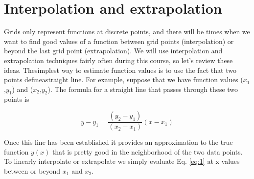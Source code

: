  		\section*{Interpolation and extrapolation}
     
    Grids only represent functions at discrete points, and there will be times when we want to find good values of a function between grid points (interpolation) or beyond the last grid point (extrapolation). We will use interpolation and extrapolation techniques fairly often during this course, so let\rq s review these ideas. Thesimplest way to estimate function values is to use the fact that two points defineastraight line. For example, suppose that we have function values ($x_1$,$y_1$) and ($x_2$,$y_2$). The formula for a straight line that passes through these two points is   
    
\begin{equation} \label{eq:1}
    y - y_1 = \frac{(y_2-y_1)}{(x_2-x_1)}(x-x_1) 
\end{equation}  
  
    Once this line has been established it provides an approximation to the true function $y(x)$ that is pretty good in the neighborhood of the two data points. To linearly interpolate or extrapolate we simply evaluate Eq. \eqref{eq:1} at x values between or beyond $x_1$ and $x_2$.   
      
